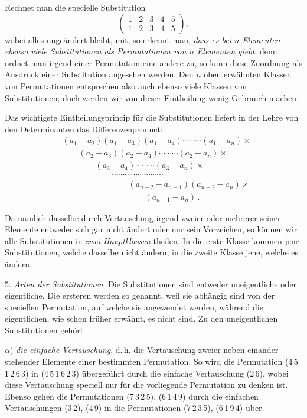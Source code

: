 \documentclass[11pt]{article}
\providecommand{\weberpage}[1]{}
\begin{document}
Rechnet man die specielle Substitution
\[
\begin{pmatrix} 1 & 2 & 3 & 4 & 5\\ 1 & 2 & 3 & 4 & 5 \end{pmatrix},
\]
wobei alles ungeändert bleibt, mit, so erkennt man, \textit{dass es bei $n$ Elementen ebenso viele Substitutionen als Permutationen von $n$ Elementen giebt}; denn ordnet man irgend einer Permutation eine andere zu, so kann diese Zuordnung als Ausdruck einer Substitution angesehen werden. Den $n$ oben erwähnten Klassen von Permutationen entsprechen also auch ebenso viele Klassen von Substitutionen; doch werden wir von dieser Eintheilung wenig Gebrauch machen.

Das wichtigste Eintheilungsprincip für die Substitutionen liefert in der Lehre von den Determinanten das Differenzenproduct:
\[
\begin{aligned}
&(a_1-a_2)(a_1-a_3)(a_1-a_4)\cdots\cdots\cdots(a_1-a_n) \times\\
&\qquad(a_2-a_3)(a_2-a_4)\cdots\cdots\cdots(a_2-a_n) \times\\
&\qquad\qquad(a_3-a_4)\cdots\cdots\cdots(a_3-a_n) \times\\
&\qquad\qquad\qquad\cdots\cdots\cdots\cdots\cdots\cdots\cdots\cdots\\
&\qquad\qquad\qquad\qquad(a_{n-2}-a_{n-1})(a_{n-2}-a_n) \times\\
&\qquad\qquad\qquad\qquad\qquad(a_{n-1}-a_n)\,.
\end{aligned}
\]


\weberpage{5}
Da nämlich dasselbe durch Vertauschung irgend zweier oder mehrerer seiner
Elemente entweder sich gar nicht ändert oder nur sein Vorzeichen, so
können wir alle Substitutionen in \textit{zwei Hauptklassen} theilen. In die
erste Klasse kommen jene Substitutionen, welche dasselbe nicht ändern, in
die zweite Klasse jene, welche es ändern.

5. \textit{Arten der Substitutionen}. Die Substitutionen sind entweder
uneigentliche oder eigentliche. Die ersteren werden so genannt, weil sie
abhängig sind von der speciellen Permutation, auf welche sie angewendet
werden, während die eigentlichen, wie schon früher erwähnt, es nicht
sind. Zu den uneigentlichen Substitutionen gehört

$\alpha$) \textit{die einfache Vertauschung}, d.\,h. die Vertauschung
zweier neben einander stehender Elemente einer bestimmten Permutation.
So wird die Permutation (4\,5\,1\,2\,6\,3) in (4\,5\,1\,6\,2\,3)
übergeführt durch die einfache Vertauschung (2\,6), wobei diese
Vertauschung speciell nur für die vorliegende Permutation zu denken ist.
Ebenso gehen die Permutationen (7\,3\,2\,5), (6\,1\,4\,9) durch die
einfachen Vertauschungen (3\,2), (4\,9) in die Permutationen (7\,2\,3\,5),
(6\,1\,9\,4) über.
\end{document}
